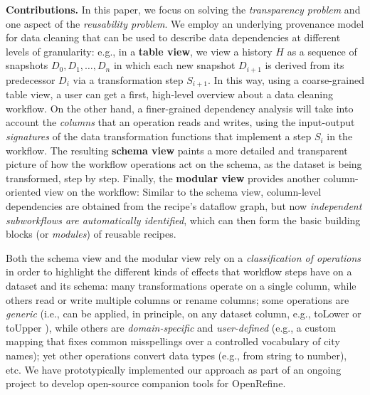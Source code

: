 \documentclass[conference]{ijdc-v14}
\newcommand{\openrefine}{\textrm{OpenRefine}\xspace}
\newcommand{\co}[1]{\textsf{\small{#1}}}
\begin{document}
\textbf{Contributions.} In this paper, we focus on solving the \emph{transparency problem} and one
aspect of the \emph{reusability problem}. We employ an underlying provenance model for data cleaning
that can be used to describe data dependencies at different levels of granularity: e.g., in a
{\textbf{table view}}, we view a history $H$ as a sequence of snapshots $D_0, D_1, \dots, D_n$ in
which each new snapshot $D_{i+1}$ is derived from its predecessor $D_{i}$ via a transformation step
$S_{i+1}$.  In this way, using a coarse-grained table view, a user can get a first, high-level
overview about a data cleaning workflow. On the other hand, a finer-grained dependency analysis will
take into account the \emph{columns} that an operation reads and writes, using the input-output
\emph{signatures} of the data transformation functions that implement a step $S_i$ in the workflow.
The resulting {\textbf{schema view}} paints a more detailed and transparent picture of how the
workflow operations act on the schema, as the dataset is being transformed, step by step.  Finally,
the {\textbf{modular view}} provides another column-oriented view on the workflow: Similar to the
schema view, column-level dependencies are obtained from the recipe's dataflow graph, but now
\emph{independent subworkflows are automatically identified}, which can then form the basic building
blocks (or \emph{modules}) of reusable recipes.
%

Both the schema view and the modular view rely on a \emph{classification of operations} in order to
highlight the different kinds of effects that workflow steps have on a dataset and its
schema: %
many transformations operate on a {single} column, while others read or write {multiple} columns or
rename columns; some operations are \emph{generic} (i.e., can be applied, in principle, on any
dataset column, e.g., \co{toLower} or \co{toUpper }), while others are \emph{domain-specific}
and \emph{user-defined} (e.g., a custom mapping that fixes common misspellings over a controlled
vocabulary of city names); yet other operations convert data types (e.g., from string to number),
etc. We have prototypically implemented our approach as part of an ongoing project to develop
open-source companion tools for \openrefine \cite{orma2021}.


\end{document}
